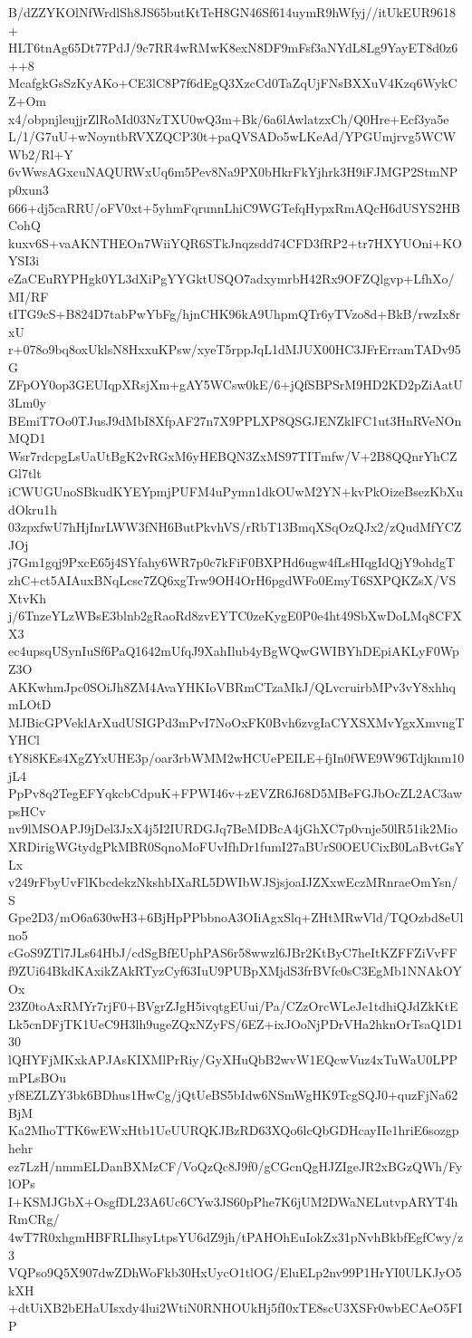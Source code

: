 B/dZZYKOlNfWrdlSh8JS65butKtTeH8GN46Sf614uymR9hWfyj//itUkEUR9618+
HLT6tnAg65Dt77PdJ/9c7RR4wRMwK8exN8DF9mFsf3aNYdL8Lg9YayET8d0z6++8
McafgkGsSzKyAKo+CE3lC8P7f6dEgQ3XzcCd0TaZqUjFNsBXXuV4Kzq6WykCZ+Om
x4/obpnjleujjrZlRoMd03NzTXU0wQ3m+Bk/6a6lAwlatzxCh/Q0Hre+Ecf3ya5e
L/1/G7uU+wNoyntbRVXZQCP30t+paQVSADo5wLKeAd/YPGUmjrvg5WCWWb2/Rl+Y
6vWwsAGxcuNAQURWxUq6m5Pev8Na9PX0bHkrFkYjhrk3H9iFJMGP2StmNPp0xun3
666+dj5caRRU/oFV0xt+5yhmFqrunnLhiC9WGTefqHypxRmAQcH6dUSYS2HBCohQ
kuxv6S+vaAKNTHEOn7WiiYQR6STkJnqzsdd74CFD3fRP2+tr7HXYUOni+KOYSI3i
eZaCEuRYPHgk0YL3dXiPgYYGktUSQO7adxymrbH42Rx9OFZQlgvp+LfhXo/MI/RF
tITG9cS+B824D7tabPwYbFg/hjnCHK96kA9UhpmQTr6yTVzo8d+BkB/rwzIx8rxU
r+078o9bq8oxUklsN8HxxuKPsw/xyeT5rppJqL1dMJUX00HC3JFrErramTADv95G
ZFpOY0op3GEUIqpXRsjXm+gAY5WCsw0kE/6+jQfSBPSrM9HD2KD2pZiAatU3Lm0y
BEmiT7Oo0TJusJ9dMbI8XfpAF27n7X9PPLXP8QSGJENZklFC1ut3HnRVeNOnMQD1
Wsr7rdcpgLsUaUtBgK2vRGxM6yHEBQN3ZxMS97TITmfw/V+2B8QQnrYhCZGl7tlt
iCWUGUnoSBkudKYEYpmjPUFM4uPymn1dkOUwM2YN+kvPkOizeBsezKbXudOkru1h
03zpxfwU7hHjInrLWW3fNH6ButPkvhVS/rRbT13BmqXSqOzQJx2/zQudMfYCZJOj
j7Gm1gqj9PxcE65j4SYfahy6WR7p0c7kFiF0BXPHd6ugw4fLsHIqgIdQjY9ohdgT
zhC+ct5AIAuxBNqLcsc7ZQ6xgTrw9OH4OrH6pgdWFo0EmyT6SXPQKZsX/VSXtvKh
j/6TnzeYLzWBsE3blnb2gRaoRd8zvEYTC0zeKygE0P0e4ht49SbXwDoLMq8CFXX3
ec4upsqUSynIuSf6PaQ1642mUfqJ9XahIlub4yBgWQwGWIBYhDEpiAKLyF0WpZ3O
AKKwhmJpc0SOiJh8ZM4AvaYHKIoVBRmCTzaMkJ/QLvcruirbMPv3vY8xhhqmLOtD
MJBicGPVeklArXudUSIGPd3mPvI7NoOxFK0Bvh6zvgIaCYXSXMvYgxXmvngTYHCl
tY8i8KEs4XgZYxUHE3p/oar3rbWMM2wHCUePEILE+fjIn0fWE9W96Tdjknm10jL4
PpPv8q2TegEFYqkcbCdpuK+FPWI46v+zEVZR6J68D5MBeFGJbOcZL2AC3awpsHCv
nv9lMSOAPJ9jDel3JxX4j5I2IURDGJq7BeMDBcA4jGhXC7p0vnje50lR51ik2Mio
XRDirigWGtydgPkMBR0SqnoMoFUvIfhDr1fumI27aBUrS0OEUCixB0LaBvtGsYLx
v249rFbyUvFlKbcdekzNkshbIXaRL5DWIbWJSjsjoaIJZXxwEczMRnraeOmYsn/S
Gpe2D3/mO6a630wH3+6BjHpPPbbnoA3OIiAgxSlq+ZHtMRwVld/TQOzbd8eUlno5
cGoS9ZTl7JLs64HbJ/cdSgBfEUphPAS6r58wwzl6JBr2KtByC7heItKZFFZiVvFF
f9ZUi64BkdKAxikZAkRTyzCyf63IuU9PUBpXMjdS3frBVfc0sC3EgMb1NNAkOYOx
23Z0toAxRMYr7rjF0+BVgrZJgH5ivqtgEUui/Pa/CZzOrcWLeJe1tdhiQJdZkKtE
Lk5cnDFjTK1UeC9H3lh9ugeZQxNZyFS/6EZ+ixJOoNjPDrVHa2hknOrTsaQ1D130
lQHYFjMKxkAPJAsKIXMlPrRiy/GyXHuQbB2wvW1EQcwVuz4xTuWaU0LPPmPLsBOu
yf8EZLZY3bk6BDhus1HwCg/jQtUeBS5bIdw6NSmWgHK9TcgSQJ0+quzFjNa62BjM
Ka2MhoTTK6wEWxHtb1UeUURQKJBzRD63XQo6lcQbGDHcayIIe1hriE6sozgphehr
ez7LzH/nmmELDanBXMzCF/VoQzQc8J9f0/gCGcnQgHJZIgeJR2xBGzQWh/FylOPs
I+KSMJGbX+OsgfDL23A6Uc6CYw3JS60pPhe7K6jUM2DWaNELutvpARYT4hRmCRg/
4wT7R0xhgmHBFRLIhsyLtpsYU6dZ9jh/tPAHOhEuIokZx31pNvhBkbfEgfCwy/z3
VQPso9Q5X907dwZDhWoFkb30HxUycO1tlOG/EluELp2nv99P1HrYI0ULKJyO5kXH
+dtUiXB2bEHaUIsxdy4lui2WtiN0RNHOUkHj5fI0xTE8scU3XSFr0wbECAeO5FIP
